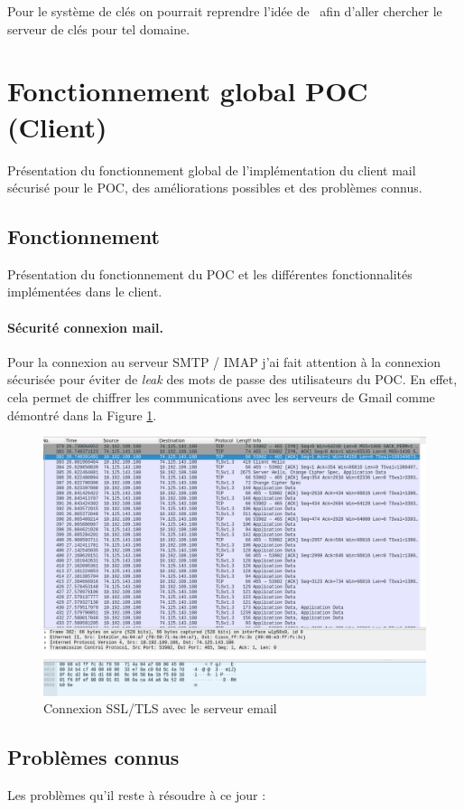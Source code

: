 Pour le système de clés on pourrait reprendre l'idée de~\cite{DBLP:journals/ijnsec/BalakrishnanR16} afin d'aller chercher le serveur de clés pour tel domaine.
\section{Fonctionnement global POC (Client)}
Présentation du fonctionnement global de l'implémentation du client mail sécurisé pour le POC, des améliorations possibles et des problèmes connus.
\subsection{Fonctionnement}
Présentation du fonctionnement du POC et les différentes fonctionnalités implémentées dans le client.
\paragraph*{Sécurité connexion mail.}
Pour la connexion au serveur SMTP / IMAP j'ai fait attention à la connexion sécurisée pour éviter de \textit{leak} des mots de passe des utilisateurs du POC. En effet, cela permet de chiffrer les communications avec les serveurs de Gmail comme démontré dans la Figure \ref{fig:securityProofEmail}.
\begin{figure}[h!]
	\centering
	\includegraphics[width=14cm]{images/packetProofEncrypted.png}
	\caption{Connexion SSL/TLS avec le serveur email}
	\label{fig:securityProofEmail}
\end{figure}
\subsection{Problèmes connus}
Les problèmes qu'il reste à résoudre à ce jour :
